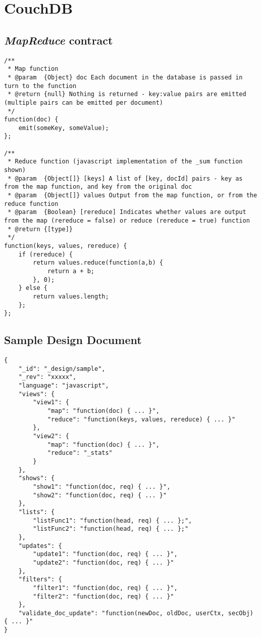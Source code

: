 \section{CouchDB}
\subsection{\textit{MapReduce} contract}
\label{couchdb-mapreduce-contracts}
\begin{verbatim}
/**
 * Map function
 * @param  {Object} doc Each document in the database is passed in turn to the function
 * @return {null} Nothing is returned - key:value pairs are emitted (multiple pairs can be emitted per document)
 */
function(doc) {
    emit(someKey, someValue);
};

/**
 * Reduce function (javascript implementation of the _sum function shown)
 * @param  {Object[]} [keys] A list of [key, docId] pairs - key as from the map function, and key from the original doc
 * @param  {Object[]} values Output from the map function, or from the reduce function
 * @param  {Boolean} [rereduce] Indicates whether values are output from the map (rereduce = false) or reduce (rereduce = true) function
 * @return {[type]}
 */
function(keys, values, rereduce) {
    if (rereduce) {
        return values.reduce(function(a,b) {
            return a + b;
        }, 0);
    } else {
        return values.length;
    };
};
\end{verbatim}

\subsection{Sample Design Document}
\label{couchdb-design-doc-sample}
\begin{verbatim}
{
    "_id": "_design/sample",
    "_rev": "xxxxx",
    "language": "javascript",
    "views": {
        "view1": {
            "map": "function(doc) { ... }",
            "reduce": "function(keys, values, rereduce) { ... }"
        },
        "view2": {
            "map": "function(doc) { ... }",
            "reduce": "_stats"            
        }
    },
    "shows": {
        "show1": "function(doc, req) { ... }",
        "show2": "function(doc, req) { ... }"
    },
    "lists": {
        "listFunc1": "function(head, req) { ... };",
        "listFunc2": "function(head, req) { ... };"
    },
    "updates": {
        "update1": "function(doc, req) { ... }",
        "update2": "function(doc, req) { ... }"
    },
    "filters": {
        "filter1": "function(doc, req) { ... }",
        "filter2": "function(doc, req) { ... }"
    },
    "validate_doc_update": "function(newDoc, oldDoc, userCtx, secObj) { ... }"
}
\end{verbatim}

